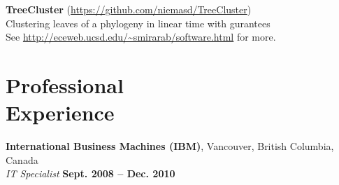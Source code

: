 \documentclass[margin,line,letterpaper]{resume}
\begin{document}
\begin{resume}
\textbf{TreeCluster} (\url{https://github.com/niemasd/TreeCluster})\\
Clustering leaves of a phylogeny in linear time with gurantees
\vspace{2mm}\\
See \url{http://eceweb.ucsd.edu/~smirarab/software.html} for more. 
    \section{\mysidestyle Professional\\Experience}

    \textbf{International Business Machines (IBM)}, Vancouver, British Columbia, Canada
\vspace{2mm}\\\vspace{1mm}%
    \textsl{IT Specialist} \hfill \textbf{Sept. 2008 -- Dec. 2010}



\end{resume}
\end{document}
